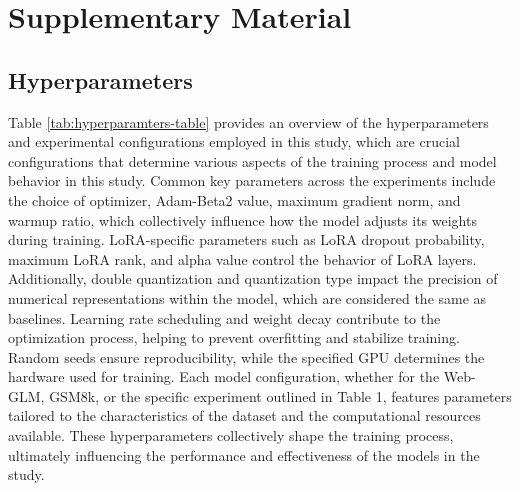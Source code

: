 \documentclass[11pt]{article}
\begin{document}



% 


\appendix
\section{Supplementary Material}

\subsection{Hyperparameters}
\label{ap:hyperparameters}
Table \ref{tab:hyperparamters-table} provides an overview of the hyperparameters and experimental configurations employed in this study, which are crucial configurations that determine various aspects of the training process and model behavior in this study. Common key parameters across the experiments include the choice of optimizer, Adam-Beta2 value, maximum gradient norm, and warmup ratio, which collectively influence how the model adjusts its weights during training. LoRA-specific parameters such as LoRA dropout probability, maximum LoRA rank, and alpha value control the behavior of LoRA layers. Additionally, double quantization and quantization type impact the precision of numerical representations within the model, which are considered the same as baselines. Learning rate scheduling and weight decay contribute to the optimization process, helping to prevent overfitting and stabilize training. Random seeds ensure reproducibility, while the specified GPU determines the hardware used for training. Each model configuration, whether for the Web-GLM, GSM8k, or the specific experiment outlined in Table 1, features parameters tailored to the characteristics of the dataset and the computational resources available. These hyperparameters collectively shape the training process, ultimately influencing the performance and effectiveness of the models in the study.
\end{document}

